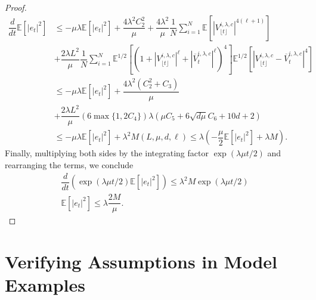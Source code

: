 \documentclass[a4paper, 10pt]{article}
\theoremstyle{plain}%
\begin{document}
\begin{proof}
\begin{align*}
\dfrac{d}{dt}\mathbb{E}\left[|e_t|^2\right]&\leq -\mu\lambda\mathbb{E}\left[|e_t|^2\right]+\dfrac{4\lambda^2C_2^2}{\mu}+\dfrac{4\lambda^2}{\mu}\dfrac{1}{N}\sum_{i=1}^N\mathbb{E}\left[|V_{\lfloor{t}\rfloor}^{i,\lambda,c}|^{4(\ell+1)}\right]\\
&+\dfrac{2\lambda L^2}{\mu}\dfrac{1}{N}\sum_{i=1}^N\mathbb{E}^{1/2}\left[(1+|V_{\lfloor{t}\rfloor}^{i,\lambda,c}|^{\ell}+|\overline{V}_{t}^{i,\lambda,c}|^{\ell})^4\right]\mathbb{E}^{1/2}\left[|V_{\lfloor{t}\rfloor}^{i,\lambda,c}-\overline{V}_{t}^{i,\lambda,c}|^4\right]\\
&\leq -\mu\lambda\mathbb{E}\left[|e_t|^2\right]+\dfrac{4\lambda^2 (C_2^2+C_3)}{\mu}\\&+\dfrac{2\lambda L^2}{\mu}\left(6\max\{1,2C_4\}\right)\lambda\left(\mu C_5+6\sqrt{d\mu}C_6+10d+2\right)\\
&\leq -\mu\lambda\mathbb{E}\left[|e_t|^2\right]+\lambda^2 M(L,\mu,d,\ell)\leq \lambda\left(-\dfrac{\mu}{2}\mathbb{E}\left[|e_t|^2\right]+\lambda M\right).
\end{align*}
Finally, multiplying both sides by the integrating factor $\exp{\left(\lambda\mu t/2\right)}$ and rearranging the terms, we conclude
\begin{gather*}
\dfrac{d}{dt}\left(\exp{(\lambda\mu t/2)}\mathbb{E}\left[|e_t|^2\right]\right)\leq \lambda^2 M \exp{(\lambda\mu t/2)}\\
\mathbb{E}\left[|e_t|^2\right]\leq \lambda \dfrac{2 M}{\mu}.
\end{gather*}
\end{proof}
\section{Verifying Assumptions in Model Examples}
\end{document}
